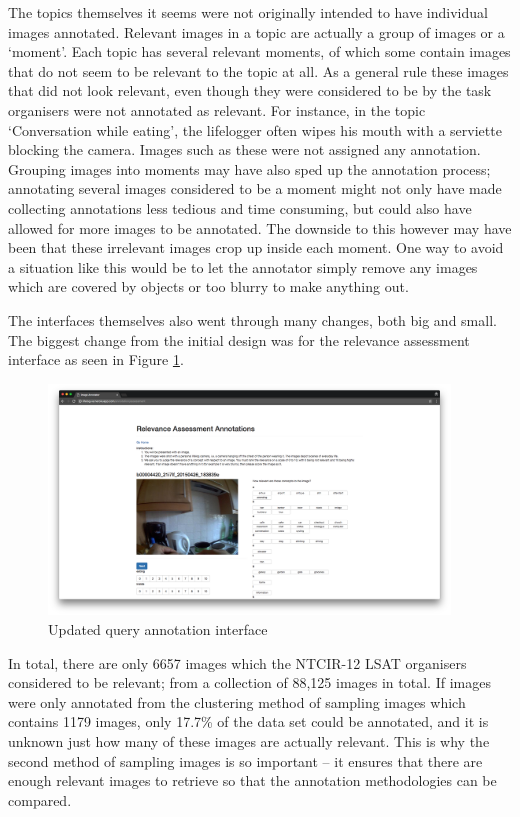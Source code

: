 The topics themselves it seems were not originally intended to have individual images annotated. Relevant images in a topic are actually a group of images or a `moment'. Each topic has several relevant moments, of which some contain images that do not seem to be relevant to the topic at all. As a general rule these images that did not look relevant, even though they were considered to be by the task organisers were not annotated as relevant. For instance, in the topic `Conversation while eating', the lifelogger often wipes his mouth with a serviette blocking the camera. Images such as these were not assigned any annotation. Grouping images into moments may have also sped up the annotation process; annotating several images considered to be a moment might not only have made collecting annotations less tedious and time consuming, but could also have allowed for more images to be annotated. The downside to this however may have been that these irrelevant images crop up inside each moment. One way to avoid a situation like this would be to let the annotator simply remove any images which are covered by objects or too blurry to make anything out.

The interfaces themselves also went through many changes, both big and small. The biggest change from the initial design was for the relevance assessment interface as seen in Figure \ref{fig:new-rel-ass}.

\begin{figure}[hbt]
    \centering
    \includegraphics[width=0.95\textwidth]{images/new-rel-ass-interface}
    \caption{Updated query annotation interface}
    \label{fig:new-rel-ass}
\end{figure}

In total, there are only 6657 images which the NTCIR-12 LSAT organisers considered to be relevant; from a collection of 88,125 images in total. If images were only annotated from the clustering method of sampling images which contains 1179 images, only 17.7\% of the data set could be annotated, and it is unknown just how many of these images are actually relevant. This is why the second method of sampling images is so important -- it ensures that there are enough relevant images to retrieve so that the annotation methodologies can be compared.

